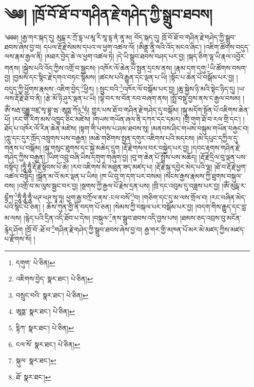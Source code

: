 \setcounter{footnote}{0} 
\chapter{༄༅། །ཁྲོ་བོ་ཐོ་བ་གཤིན་རྗེ་གཤེད་ཀྱི་སྒྲུབ་ཐབས།}༄༅༅། །རྒྱ་གར་སྐད་དུ། མུངྒ་ར་ཀྲོ་དྷ་ཡ་མཱ་རི་སཱ་དྷ་ནཾ་ནཱ་མ། བོད་སྐད་དུ། ཁྲོ་བོ་ཐོ་བ་གཤིན་རྗེ་གཤེད་ཀྱི་སྒྲུབ་ཐབས་ཞེས་བྱ་བ། དཔལ་རྡོ་རྗེ་སེམས་དཔའ་ལ་ཕྱག་འཚལ་ལོ། །ཨིནྡྲ་ནཱི་ལའི་འོད་མངའ་ཞིང་། །འཇིག་ཚོགས་བདུད་ལས་རྣམ་རྒྱལ་ནི། །མཐར་བྱེད་ཆེ་ལ་ཕྱག་འཚལ་ཏེ། །དེ་ཡི་སྒྲུབ་ཐབས་བཤད་པར་བྱ། །སྐད་ཅིག་ལྷ་ཡི་རྣལ་འབྱོར་གནས། །སྐྱེས་པའི་འོད་ཀྱིས་འགྲོ་བ་སྦྱངས། །འཁོར་ལོ་ཆེན་པོ་སྤྱན་དྲངས་ནས། །རྣམ་དག་དགུ་\footnote{དགུག་  པེ་ཅིན། }ཡི་ཚོགས་བསག་བྱ། །བྱམས་དང་སྙིང་རྗེ་དགའ་བཏང་སྙོམས། །ཚངས་པའི་རྒྱུན་དང་ལྡན་པ་ཡི། །སྟོང་པ་ཆེན་པོ་བསྒོམ་པར་བྱ། །བདུད་ཀྱི་ཕྱོགས་རྣམས་:འཇིག་བྱེད་\footnote{འཇིགས་བྱེད་  སྣར་ཐང་།  པེ་ཅིན། }ཕྱིར། །:སྲུང་བའི་\footnote{བསྲུང་བའི་  སྣར་ཐང་།  པེ་ཅིན། }འཁོར་ལོ་བསྒོམ་པར་བྱ། །ཆུ་སྐྱེས་ཉི་མའི་སྟེང་ཉིད་དུ། །ཡ་ལས་རྡོ་རྗེ་ཐོ་བ་ནི། །རྩེ་མོ་ཉི་ཤུར་ལྡན་པ་ཡི། །ལྟེ་བར་ས་བོན་རབ་བཞག་ནས། །སྤྲོ་བསྡུ་བྱས་ནས་ང་རྒྱལ་བསམ། །ཨོཾ་སརྦ་བུདྡྷ་བཛྲ་སྭ་བྷཱ་ཝ་:ཨཱཏྨ་ཀོ྅\footnote{ཨཱཏྨ་  སྣར་ཐང་།  པེ་ཅིན། }ཧཾ། གྱུར་པས་ཐོ་བ་གཤིན་རྗེ་གཤེད་དུ་བསྒོམ། །སྐུ་མདོག་སྔོན་པོ་འཇིགས་ཆེན་པོ། །རང་གི་རིག་མས་འཁྱུད་ཅིང་མཛེས། །གཡས་གཡོན་ཞལ་ནི་དཀར་དང་དམར། །གྲི་གུག་ཐོ་བ་རལ་གྲི་དང་། །ཐོད་པ་འཁོར་ལོ་རིན་ཆེན་མཛེས། །སྟག་གི་པགས་པ་ཤམ་ཐབས་སུ། །མནབས་ཤིང་གཡས་བསྐུམ་གཡོན་བརྐྱང་བ། །ཀླུ་དང་དུར་ཁྲོད་འཁྲུགས་པས་བརྒྱན། །མཆེ་གཙིགས་སྤྱན་དགུར་འཇིགས་པའི་མདངས། །མེ་དཔུང་དཀྱིལ་དུ་གནས་པ་བསྒོམ། །སྐུ་གསུང་ཐུགས་དང་སྐྱེ་མཆེད་དྲུག །རྡོ་རྗེ་གསལ་བར་བསྐྱེད་པར་བྱ། །དབང་རྟགས་གཤིན་རྗེ་གཤེད་ཀྱིས་བརྒྱན། །ཡིག་འབྲུ་བཞི་ཡིས་དགུག་གཞུག་བྱ། །བུ་ག་ཆེན་པོ་སྤྲོས་པས་མཆོད། །རྡོ་རྗེ་དྲིལ་བུ་ལྡན་པས་བསྟོད། །ཧཱུྃ་ཧཱུྃ་རྡོ་རྗེ་སྟོབས་པོ་ཆེ། །རབ་འཇིགས་མི་མཐུན་ཟད་མཛད་པ། །རྡོ་རྗེ་སྐུ་དབྱེར་མེད་པའི་ལྷ། །ཐོ་བ་རྡོ་རྗེ་ཕྱག་འཚལ་བསྟོད། །སྒྲོན་མ་འོ་མར་ལྡན་པ་ཡིས། །ཁ་ཡི་བུ་ག་དག་པར་བསམ། །སངས་རྒྱས་རྣམས་ཀྱི་ཐུགས་བསྐུལ་བས། །འགྲོ་བ་མ་ལུས་སྦྱང་བར་བྱ། །སྔགས་ཀྱི་རྒྱལ་པོ་རྗེས་དྲན་པས། །ཁྲི་དང་འབུམ་དུ་བཟླས་པར་བྱ། །ཨོཾ་མུངྒ་ར་དྷྲྀཀ་\footnote{དྷིཀ་  སྣར་ཐང་།  པེ་ཅིན། }ཧཱུྃ་ཧཱུྃ་ཧཱུྃ་ཕཊ་ཕཊ་སྭཱ་ཧཱ། ཕྱག་རྒྱ་བཀྲོལ་ནས་:ངལ་བསོ་\footnote{ངལ་སོ་  སྣར་ཐང་།  པེ་ཅིན། }བ། །གཅིག་དང་དུ་མ་ལས་གྲོལ་བ། །རང་བཞིན་མེད་པའི་སྙིང་པོ་ཅན། །
ཆོས་ཀུན་གྱི་ནི་བདག་པོ་ཅན། །སེམས་ཀྱི་བསྐལ་པར་བསྒོམ་པར་བྱ། །བདག་གིས་རྒྱུད་དང་བླ་མ་ལས། །རྙེད་པའི་དྲིན་འདི་ཐོབ་པ་དེས། །བསྐུལ་\footnote{སྐུལ་  སྣར་ཐང་། }ནས་སྒྲུབ་ཐབས་འདི་བྱས་པས། །ཐམས་ཅད་འབྲས་བུ་མངོན་རྙེད་ཤོག །ཁྲོ་བོ་:ཐོ་བ་\footnote{ཐོ་  སྣར་ཐང་། }གཤིན་རྗེ་གཤེད་ཀྱི་སྒྲུབ་ཐབས་ཞེས་བྱ་བ། རྒྱ་གར་གྱི་མཁན་པོ་མར་མེ་མཛད་ཀྱིས་མཛད་པ་རྫོགས་སོ། ། 